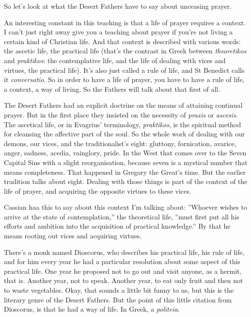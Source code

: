So let's look at what the Desert Fathers have to say about unceasing prayer.

An interesting constant in this teaching is that a life of prayer requires a context. I can't just right away give you a teaching about prayer if you're not living a certain kind of Christian life. And that context is described with various words: the ascetic life, the practical life (that's the contrast in Greek between \emph{theoretikos} and \emph{praktikos}: the contemplative life, and the life of dealing with vices and virtues, the practical life). It's also just called a rule of life, and St Benedict calls it \emph{conversatio}. So in order to have a life of prayer, you have to have a rule of life, a context, a way of living. So the Fathers will talk about that first of all.

The Desert Fathers had an explicit doctrine on the means of attaining continual prayer. But in the first place they insisted on the necessity of \emph{praxis} or \emph{ascesis}. The ascetical life, or in Evagrius' terminology, \emph{praktikos}, is the spiritual method for cleansing the affective part of the soul. So the whole work of dealing with our demons, our vices, and the traditionalist's eight: gluttony, fornication, avarice, anger, sadness, acedia, vainglory, pride. In the West that comes over to the Seven Capital Sins with a slight reorganisation, because seven is a mystical number that means completeness. That happened in Gregory the Great's time. But the earlier tradition talks about eight. Dealing with those things is part of the context of the life of prayer, and acquiring the opposite virtues to these vices.

Cassian haa this to say about this context I'm talking about: ''Whoever wishes to arrive at the state of contemplation,'' the theoretical life, ''must first put all his efforts and ambition into the acquisition of practical knowledge.'' By that he means rooting out vices and acquiring virtues.

There's a monk named Dioscorus, who describes his practical life, his rule of life, and for him every year he had a particular resolution about some aspect of this practical life. One year he proposed not to go out and visit anyone, as a hermit, that is. Another year, not to speak. Another year, to eat only fruit and then not to waste vegetables. Okay, that sounds a little bit funny to us, but this is the literary genre of the Desert Fathers. But the point of this little citation from Dioscorus, is that he had a way of life. In Greek, a \emph{politeia}.

